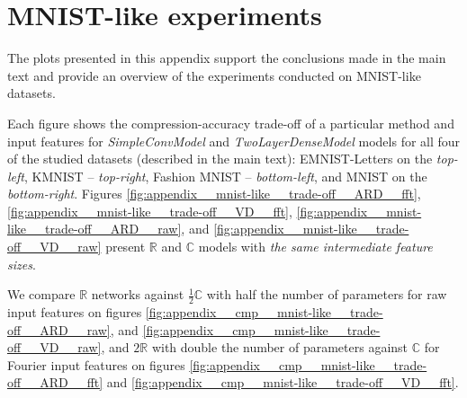 \documentclass[a4paper,10pt,twocolumn]{article}
\newcommand{\real}{\mathbb{R}}
\newcommand{\cplx}{\mathbb{C}}
\begin{document}

\section{MNIST-like experiments} %
\label{sec:mnist_like_experiments}

The plots presented in this appendix support the conclusions made in the main text and
provide an overview of the experiments conducted on MNIST-like datasets.

Each figure shows the compression-accuracy trade-off of a particular method and input
features for \emph{SimpleConvModel} and \emph{TwoLayerDenseModel} models for all four
of the studied datasets (described in the main text): EMNIST-Letters on the \emph{top-left},
KMNIST -- \emph{top-right}, Fashion MNIST -- \emph{bottom-left}, and MNIST on the
\emph{bottom-right}.
%
Figures \ref{fig:appendix__mnist-like__trade-off__ARD__fft}, \ref{fig:appendix__mnist-like__trade-off__VD__fft},
\ref{fig:appendix__mnist-like__trade-off__ARD__raw}, and \ref{fig:appendix__mnist-like__trade-off__VD__raw}
present $\real$ and $\cplx$ models with \emph{the same intermediate feature sizes}.

We compare $\real$ networks against $\tfrac12 \cplx$ with half the number of parameters
for raw input features on figures \ref{fig:appendix__cmp__mnist-like__trade-off__ARD__raw},
and \ref{fig:appendix__cmp__mnist-like__trade-off__VD__raw}, and $2 \real$ with
double the number of parameters against $\cplx$ for Fourier input features on figures
\ref{fig:appendix__cmp__mnist-like__trade-off__ARD__fft} and
\ref{fig:appendix__cmp__mnist-like__trade-off__VD__fft}.
\end{document}
